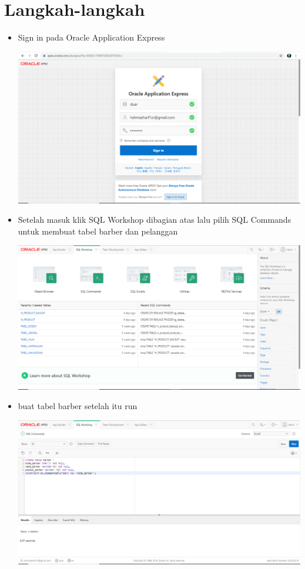 ﻿\documentclass{article}
\begin{document}
\section{Langkah-langkah}
\begin{itemize}
        \item Sign in pada Oracle Application Express
        \begin{center}
        \centering
        \includegraphics[scale=0.3]{gambar/1.PNG}
    \end{center}
    
        \item Setelah masuk klik SQL Workshop dibagian atas lalu pilih SQL Commands untuk membuat tabel barber dan pelanggan
        \begin{center}
        \centering
        \includegraphics[scale=0.3]{gambar/2.PNG}
    \end{center}
    
        \item buat tabel barber setelah itu run 
        \begin{center}
        \centering
        \includegraphics[scale=0.3]{gambar/3.PNG}
    \end{center}
    

\end{itemize}
\end{document}
